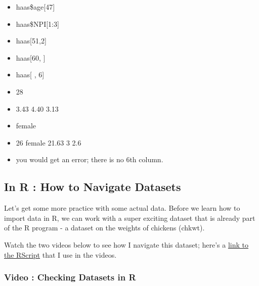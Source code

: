 \documentclass[
  letterpaper,
  DIV=11,
  numbers=noendperiod,
  oneside]{scrreprt}
\providecommand{\tightlist}{%
  \setlength{\itemsep}{0pt}\setlength{\parskip}{0pt}}\usepackage{longtable,booktabs,array}
\begin{document}
\begin{itemize}
\tightlist
\item
  haas\$age{[}47{]}
\item
  haas\$NPI{[}1:3{]}
\item
  haas{[}51,2{]}
\item
  haas{[}60, {]}
\item
  haas{[} , 6{]}
\end{itemize}

\begin{tcolorbox}[enhanced jigsaw, toptitle=1mm, toprule=.15mm, rightrule=.15mm, breakable, left=2mm, colbacktitle=quarto-callout-tip-color!10!white, colback=white, opacityback=0, coltitle=black, bottomtitle=1mm, opacitybacktitle=0.6, titlerule=0mm, leftrule=.75mm, arc=.35mm, bottomrule=.15mm, title=\textcolor{quarto-callout-tip-color}{\faLightbulb}\hspace{0.5em}{Answer Key : Indexing!}, colframe=quarto-callout-tip-color-frame]

\begin{itemize}
\tightlist
\item
  28
\item
  3.43 4.40 3.13
\item
  female
\item
  26 female 21.63 3 2.6
\item
  you would get an error; there is no 6th column.
\end{itemize}

\end{tcolorbox}

\subsection{In R : How to Navigate
Datasets}\label{in-r-how-to-navigate-datasets}

Let's get some more practice with some actual data. Before we learn how
to import data in R, we can work with a super exciting dataset that is
already part of the R program - a dataset on the weights of chickens
(chkwt).

Watch the two videos below to see how I navigate this dataset; here's a
\href{https://www.dropbox.com/scl/fi/e9l24v1vshdjih7rctxcn/navigating_data.R?rlkey=st0f3hzkrkmha4u4224f6n43i&dl=0}{link
to the RScript} that I use in the videos.~

\subsubsection{Video : Checking Datasets in
R}\label{video-checking-datasets-in-r}
\end{document}
